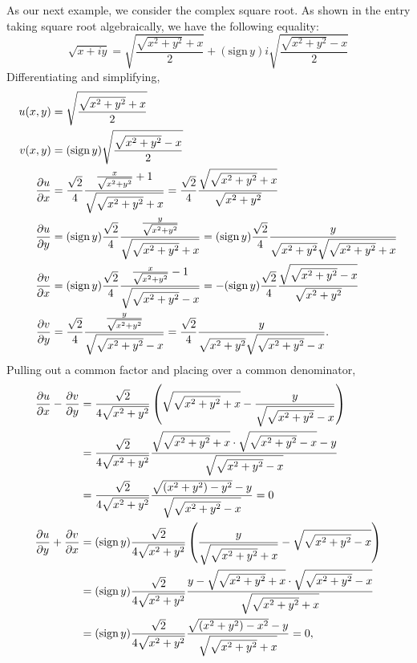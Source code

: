 \documentclass[12pt]{article}
\begin{document}
As our next example, we consider the complex
square root.  As shown in the entry taking square 
root algebraically, we have the following equality:
\[
 \sqrt{x+iy} = \sqrt{\frac{\sqrt{x^2 + y^2} + x}{2}} +
  (\mbox{sign} \, {y}) i \sqrt{\frac{\sqrt{x^2 + y^2}- x}{2}}
\]
Differentiating and simplifying,
\begin{align*}
 u(x,y) &= \sqrt{\frac{\sqrt{x^2 + y^2} + x}{2}} \\
 v(x,y) &= (\mbox{sign} \, {y}) \sqrt{\frac{\sqrt{x^2 + y^2}- x}{2}} \\
 {\partial u \over \partial x} &=
  \frac{\sqrt{2}}{4} 
    \frac{\frac{x}
               {\sqrt {x^2 + y^2}} + 1}
         {\sqrt{ \sqrt {x^2 + y^2} + x}} = 
   \frac{\sqrt{2}}{4} 
   \frac{\sqrt{\sqrt {x^2 + y^2} + x}}
       {\sqrt{x^2 + y^2}} \\
 {\partial u \over \partial y} &=
  (\mbox{sign} \, {y}) \frac{\sqrt{2}}{4} 
    \frac{\frac{y}
               {\sqrt {x^2 + y^2}}}
         {\sqrt{ \sqrt {x^2 + y^2} + x}} =
  (\mbox{sign} \, {y}) \frac{\sqrt{2}}{4} 
  \frac{y}
       {{\sqrt{x^2 + y^2}}
        {\sqrt{ \sqrt {x^2 + y^2} + x}}} \\
 {\partial v \over \partial x} &=
  (\mbox{sign} \, {y}) \frac{\sqrt{2}}{4} 
    \frac{\frac{x}
               {\sqrt {x^2 + y^2}} - 1}
               {\sqrt{ \sqrt {x^2 + y^2} - x}} = 
  -(\mbox{sign} \, {y}) \frac{\sqrt{2}}{4} 
    \frac{\sqrt{ \sqrt {x^2 + y^2} - x}}
         {\sqrt{x^2 + y^2}} \\
 {\partial v \over \partial y} &=
  \frac{\sqrt{2}}{4} 
    \frac{\frac{y}
               {\sqrt {x^2 + y^2}}}
         {\sqrt{ \sqrt {x^2 + y^2} - x}} =
  \frac{\sqrt{2}}{4}
  \frac{y}
       {\sqrt{x^2 + y^2}
        \sqrt{ \sqrt {x^2 + y^2} - x}} .
\end{align*}
Pulling out a  common factor and placing over a common denominator,
\begin{align*}
 {\partial u \over \partial x} -
        {\partial v \over \partial y} &=
 \frac{\sqrt{2}}{4 \sqrt{x^2 + y^2}} 
  \left(
    \sqrt{ \sqrt {x^2 + y^2} + x} -
  \frac{y} {\sqrt{ \sqrt {x^2 + y^2} - x}}
  \right) \\ &=
 \frac{\sqrt{2}}{4 \sqrt{x^2 + y^2}} 
 \frac{\sqrt{ \sqrt {x^2 + y^2} + x} \cdot
       \sqrt{ \sqrt {x^2 + y^2} - x} - y}
      {\sqrt{ \sqrt {x^2 + y^2} - x}} \\ &=
 \frac{\sqrt{2}}{4 \sqrt{x^2 + y^2}} 
 \frac{\sqrt{(x^2 + y^2) - y^2} - y}
      {\sqrt{ \sqrt {x^2 + y^2} - x}} = 0 \\
 {\partial u \over \partial y} +
        {\partial v \over \partial x} &=
 (\mbox{sign} \, {y})
 \frac{\sqrt{2}}{4 \sqrt{x^2 + y^2}} 
 \left(
   \frac{y}{\sqrt{ \sqrt {x^2 + y^2} + x}} -
   \sqrt{ \sqrt {x^2 + y^2} - x}
 \right) \\ &=
 (\mbox{sign} \, {y})
 \frac{\sqrt{2}}{4 \sqrt{x^2 + y^2}} 
 \frac{y - \sqrt{ \sqrt {x^2 + y^2} + x} \cdot
           \sqrt{ \sqrt {x^2 + y^2} - x}}
      {\sqrt{ \sqrt {x^2 + y^2} + x}} \\ &=
 (\mbox{sign} \, {y})
 \frac{\sqrt{2}}{4 \sqrt{x^2 + y^2}} 
 \frac{\sqrt{(x^2 + y^2) - x^2} - y}
      {\sqrt{ \sqrt {x^2 + y^2} + x}} = 0 ,
\end{align*}
\end{document}
